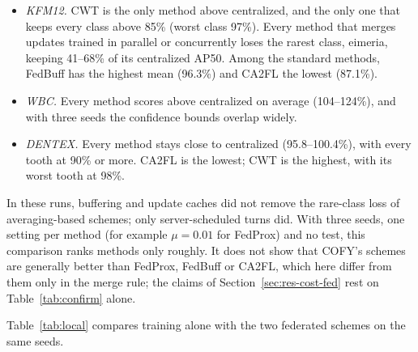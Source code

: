 \documentclass[pdflatex,sn-mathphys-num]{sn-jnl}
\newcommand{\sys}{COFY}
\begin{document}
\begin{itemize}
\item \emph{KFM12.} CWT is the only method above centralized, and the only one that keeps every class above 85\% (worst class 97\%). Every method that merges updates trained in parallel or concurrently loses the rarest class, eimeria, keeping 41--68\% of its centralized AP50. Among the standard methods, FedBuff has the highest mean (96.3\%) and CA2FL the lowest (87.1\%).
\item \emph{WBC.} Every method scores above centralized on average (104--124\%), and with three seeds the confidence bounds overlap widely.
\item \emph{DENTEX.} Every method stays close to centralized (95.8--100.4\%), with every tooth at 90\% or more. CA2FL is the lowest; CWT is the highest, with its worst tooth at 98\%.
\end{itemize}
In these runs, buffering and update caches did not remove the rare-class loss of averaging-based schemes; only server-scheduled turns did. With three seeds, one setting per method (for example $\mu=0.01$ for FedProx) and no test, this comparison ranks methods only roughly. It does not show that \sys{}'s schemes are generally better than FedProx, FedBuff or CA2FL, which here differ from them only in the merge rule; the claims of Section~\ref{sec:res-cost-fed} rest on Table~\ref{tab:confirm} alone.

Table~\ref{tab:local} compares training alone with the two federated schemes on the same seeds.
\end{document}
